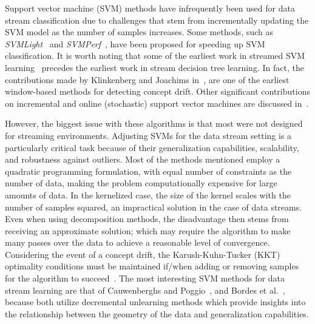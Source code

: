\documentclass[reqno]{vcuthesis}
\numberwithin{equation}{chapter}
\begin{document}
Support vector machine (SVM) methods have infrequently been used for data stream classification due to challenges that stem from incrementally updating the SVM model as the number of samples increases. Some methods, such as \textit{SVMLight}~\cite{Joachims1999} and \textit{SVMPerf}~\cite{joachims2006training}, have been proposed for speeding up SVM classification. It is worth noting that some of the earliest work in streamed SVM learning~\cite{klinkenberg2000detecting,syed1999handling} precedes the earliest work in stream decision tree learning. In fact, the contributions made by Klinkenberg and Joachims in~\cite{klinkenberg2000detecting}, are one of the earliest window-based methods for detecting concept drift. Other significant contributions on incremental and online (stochastic) support vector machines are discussed in~\cite{bordes2005fast,cauwenberghs2001incremental,domeniconi2001incremental,fung2002incremental,ralaivola2001incremental,ruping2001incremental,shilton2005incremental}.

However, the biggest issue with these algorithms is that most were not designed for streaming environments. Adjusting SVMs for the data stream setting is a particularly critical task because of their generalization capabilities, scalability, and robustness against outliers. Most of the methods mentioned employ a quadratic programming formulation, with equal number of constraints as the number of data, making the problem computationally expensive for large amounts of data. In the kernelized case, the size of the kernel scales with the number of samples squared, an impractical solution in the case of data streams. Even when using decomposition methods, the disadvantage then stems from receiving an approximate solution; which may require the algorithm to make many passes over the data to achieve a reasonable level of convergence. Considering the event of a concept drift, the Karush-Kuhn-Tucker (KKT) optimality conditions must be maintained if/when adding or removing samples for the algorithm to succeed~\cite{aggarwal}. The most interesting SVM methods for data stream learning are that of Cauwenberghs and Poggio~\cite{cauwenberghs2001incremental}, and Bordes et al.~\cite{bordes2005fast}, because both utilize decremental unlearning methods which provide insights into the relationship between the geometry of the data and generalization capabilities.
\end{document}
